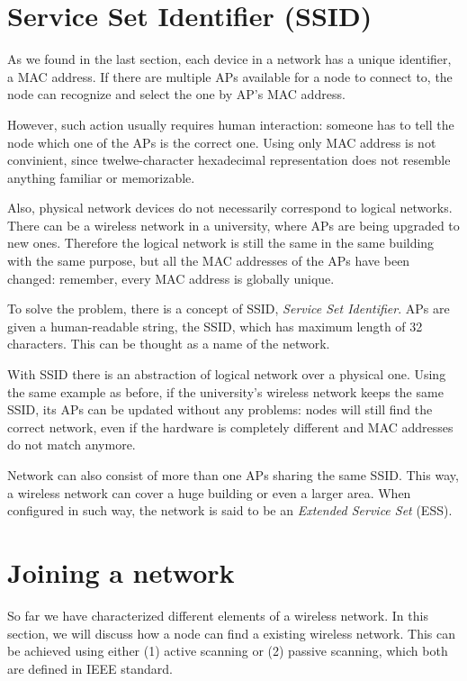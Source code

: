 \documentclass[12pt,a4paper,oneside,pdftex]{report}
\begin{document}
\section{Service Set Identifier (SSID)}
\label{sec:SSID}

As we found in the last section, each device in a network has a unique identifier, a MAC address. If there are multiple APs available for a node to connect to, the node can recognize and select the one by AP's MAC address.

However, such action usually requires human interaction: someone has to tell the node which one of the APs is the correct one. Using only MAC address is not convinient, since twelwe-character hexadecimal representation does not resemble anything familiar or memorizable.

Also, physical network devices do not necessarily correspond to logical networks. There can be a wireless network in a university, where APs are being upgraded to new ones. Therefore the logical network is still the same in the same building with the same purpose, but all the MAC addresses of the APs have been changed: remember, every MAC address is globally unique.

To solve the problem, there is a concept of SSID, \emph{Service Set Identifier}. APs are given a human-readable string, the SSID, which has maximum length of 32 characters. This can be thought as a name of the network.

With SSID there is an abstraction of logical network over a physical one. Using the same example as before, if the university's wireless network keeps the same SSID, its APs can be updated without any problems: nodes will still find the correct network, even if the hardware is completely different and MAC addresses do not match anymore.

Network can also consist of more than one APs sharing the same SSID. This way, a wireless network can cover a huge building or even a larger area. When configured in such way, the network is said to be an \emph{Extended Service Set} (ESS). \cite{IEEE802.11}


\section{Joining a network}
\label{sec:joining}

So far we have characterized different elements of a wireless network. In this section, we will discuss how a node can find a existing wireless network. This can be achieved using either (1) active scanning or (2) passive scanning, which both are defined in IEEE standard. \cite{IEEE802.11_scanning}
\end{document}
